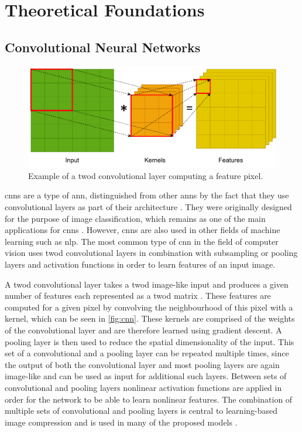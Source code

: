 \chapter{Theoretical Foundations\label{cha:chapter3}}

\section{Convolutional Neural Networks}
\begin{figure}[t]
\centering
\includegraphics[scale=0.8]{CNN.pdf}
\caption{Example of a \ac{twod} convolutional layer computing a feature pixel.}
\label{fig:cnn}
\end{figure}

\Acp{cnn} are a type of \ac{ann}, distinguished from other \acp{ann} by the fact that they use convolutional layers as part of their architecture \citep{oshea_introduction_2015}. They were originally designed for the purpose of image classification, which remains as one of the main applications for \acp{cnn} \citep{gu_recent_2018}. However, \acp{cnn} are also used in other fields of machine learning such as \ac{nlp}. The most common type of \ac{cnn} in the field of computer vision uses \ac{twod} convolutional layers in combination with subsampling or pooling layers and activation functions in order to learn features of an input image. 

A \ac{twod} convolutional layer takes a \ac{twod} image-like input and produces a given number of features each represented as a \ac{twod} matrix \citep{gu_recent_2018}. These features are computed for a given pixel by convolving the neighbourhood of this pixel with a kernel, which can be seen in \autoref{fig:cnn}. These kernels are comprised of the weights of the convolutional layer and are therefore learned using gradient descent. A pooling layer is then used to reduce the spatial dimensionality of the input. This set of a convolutional and a pooling layer can be repeated multiple times, since the output of both the convolutional layer and most pooling layers are again image-like and can be used as input for additional such layers. Between sets of convolutional and pooling layers nonlinear activation functions are applied in order for the network to be able to learn nonlinear features. The combination of multiple sets of convolutional and pooling layers  is central to learning-based image compression and is used in many of the proposed models \citep{balle_end--end_2017,balle_variational_2018,kuester_1d-convolutional_2021,kuester_transferability_2022,guo_learned_2021}.

